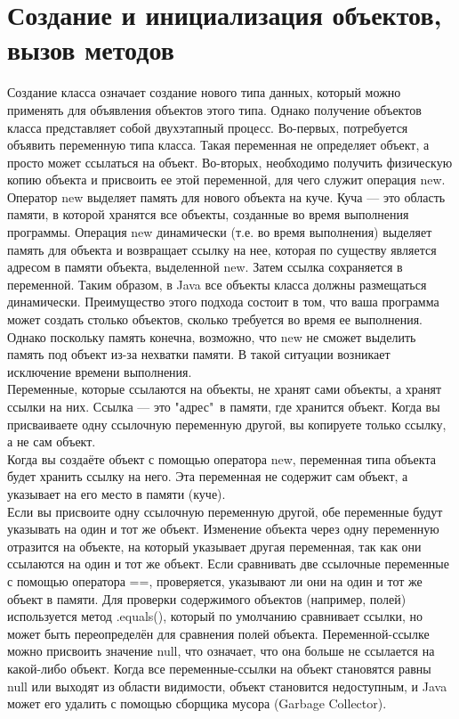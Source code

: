 \section{Создание и инициализация объектов, вызов методов}
Создание класса означает создание нового типа данных, который можно применять для объявления объектов этого типа. Однако получение объектов класса представляет собой двухэтапный процесс. Во-первых, потребуется объявить переменную типа класса. Такая переменная не определяет объект, а просто может ссылаться на объект. Во-вторых, необходимо получить физическую копию объекта и присвоить ее этой переменной, для чего служит операция new. Оператор new выделяет память для нового объекта на куче. Куча — это область памяти, в которой хранятся все объекты, созданные во время выполнения программы. Операция new динамически (т.е. во время выполнения) выделяет память для объекта и возвращает ссылку на нее, которая по существу является адресом в памяти объекта, выделенной new. Затем ссылка сохраняется в переменной. Таким образом, в Java все объекты класса должны размещаться динамически. Преимущество этого подхода состоит в том, что ваша программа может создать столько объектов, сколько требуется во время ее выполнения. Однако поскольку память конечна, возможно, что new не сможет выделить память под объект из-за нехватки памяти. В такой ситуации возникает
исключение времени выполнения. \\
Переменные, которые ссылаются на объекты, не хранят сами объекты, а хранят ссылки на них. Ссылка — это "адрес"\, в памяти, где хранится объект. Когда вы присваиваете одну ссылочную переменную другой, вы копируете только ссылку, а не сам объект. \\
Когда вы создаёте объект с помощью оператора new, переменная типа объекта будет хранить ссылку на него. Эта переменная не содержит сам объект, а указывает на его место в памяти (куче). \\
Если вы присвоите одну ссылочную переменную другой, обе переменные будут указывать на один и тот же объект. Изменение объекта через одну переменную отразится на объекте, на который указывает другая переменная, так как они ссылаются на один и тот же объект. Если сравнивать две ссылочные переменные с помощью оператора ==, проверяется, указывают ли они на один и тот же объект в памяти. Для проверки содержимого объектов (например, полей) используется метод .equals(), который по умолчанию сравнивает ссылки, но может быть переопределён для сравнения полей объекта. Переменной-ссылке можно присвоить значение null, что означает, что она больше не ссылается на какой-либо объект. Когда все переменные-ссылки на объект становятся равны null или выходят из области видимости, объект становится недоступным, и Java может его удалить с помощью сборщика мусора (Garbage Collector). \\
